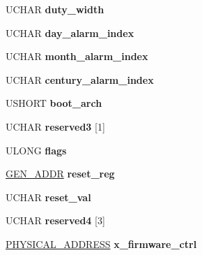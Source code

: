 \begin{DoxyCompactItemize}
\item 
\mbox{\label{struct___f_a_d_t_aad89b78369741a72e0578ce4841b357a}} 
U\+C\+H\+AR {\bfseries duty\+\_\+width}
\item 
\mbox{\label{struct___f_a_d_t_adde37b27767a5779c901e084a7cc6b8d}} 
U\+C\+H\+AR {\bfseries day\+\_\+alarm\+\_\+index}
\item 
\mbox{\label{struct___f_a_d_t_abb2a16a10809f598cc55812fbb0aa32e}} 
U\+C\+H\+AR {\bfseries month\+\_\+alarm\+\_\+index}
\item 
\mbox{\label{struct___f_a_d_t_a79d8e62dcd78ada7cd991630bf99d114}} 
U\+C\+H\+AR {\bfseries century\+\_\+alarm\+\_\+index}
\item 
\mbox{\label{struct___f_a_d_t_a9f7ed5c65c4aa49885c34e8c3fea3568}} 
U\+S\+H\+O\+RT {\bfseries boot\+\_\+arch}
\item 
\mbox{\label{struct___f_a_d_t_acef55b5451d67471e8ce104f9f86a679}} 
U\+C\+H\+AR {\bfseries reserved3} \mbox{[}1\mbox{]}
\item 
\mbox{\label{struct___f_a_d_t_a01b126c7245ed42b45e93fe0a392552f}} 
U\+L\+O\+NG {\bfseries flags}
\item 
\mbox{\label{struct___f_a_d_t_ac92a1edd53a0c9fc15e682919c775a3e}} 
\hyperlink{struct___g_e_n___a_d_d_r}{G\+E\+N\+\_\+\+A\+D\+DR} {\bfseries reset\+\_\+reg}
\item 
\mbox{\label{struct___f_a_d_t_ae79a42e127382530084db7b135183aa6}} 
U\+C\+H\+AR {\bfseries reset\+\_\+val}
\item 
\mbox{\label{struct___f_a_d_t_a2049de9a953f8d45b1857b24674bb508}} 
U\+C\+H\+AR {\bfseries reserved4} \mbox{[}3\mbox{]}
\item 
\mbox{\label{struct___f_a_d_t_abb30b53966fe7c27c3702b80a37bde3e}} 
\hyperlink{union___l_a_r_g_e___i_n_t_e_g_e_r}{P\+H\+Y\+S\+I\+C\+A\+L\+\_\+\+A\+D\+D\+R\+E\+SS} {\bfseries x\+\_\+firmware\+\_\+ctrl}
\item 

\end{DoxyCompactItemize}
